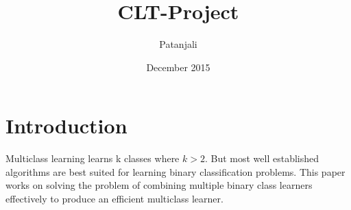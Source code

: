 \documentclass{article}
\title{CLT-Project}
\author{Patanjali}
\date{December 2015}
\begin{document}
\maketitle

\section{Introduction}
	Multiclass learning learns k classes where $k > 2$. But most well established algorithms are best suited for learning binary classification problems. This paper works on solving the problem of combining multiple binary class learners effectively to produce an efficient multiclass learner.
\end{document}
